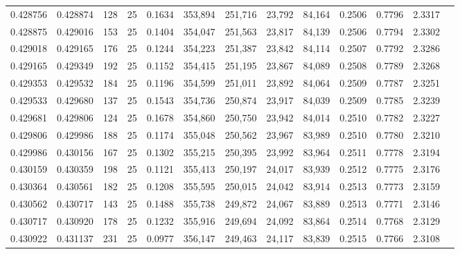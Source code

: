 \begin{tabular}{rrrrrrrrrrrrr}
0.428756 & 0.428874 &   128 &  25 &                                     0.1634 & 353,894 & 251,716 &  23,792 &  84,164 & 0.2506 & 0.7796 & 2.3317 \\
0.428875 & 0.429016 &   153 &  25 &                                     0.1404 & 354,047 & 251,563 &  23,817 &  84,139 & 0.2506 & 0.7794 & 2.3302 \\
0.429018 & 0.429165 &   176 &  25 &                                     0.1244 & 354,223 & 251,387 &  23,842 &  84,114 & 0.2507 & 0.7792 & 2.3286 \\
0.429165 & 0.429349 &   192 &  25 &                                     0.1152 & 354,415 & 251,195 &  23,867 &  84,089 & 0.2508 & 0.7789 & 2.3268 \\
0.429353 & 0.429532 &   184 &  25 &                                     0.1196 & 354,599 & 251,011 &  23,892 &  84,064 & 0.2509 & 0.7787 & 2.3251 \\
0.429533 & 0.429680 &   137 &  25 &                                     0.1543 & 354,736 & 250,874 &  23,917 &  84,039 & 0.2509 & 0.7785 & 2.3239 \\
0.429681 & 0.429806 &   124 &  25 &                                     0.1678 & 354,860 & 250,750 &  23,942 &  84,014 & 0.2510 & 0.7782 & 2.3227 \\
0.429806 & 0.429986 &   188 &  25 &                                     0.1174 & 355,048 & 250,562 &  23,967 &  83,989 & 0.2510 & 0.7780 & 2.3210 \\
0.429986 & 0.430156 &   167 &  25 &                                     0.1302 & 355,215 & 250,395 &  23,992 &  83,964 & 0.2511 & 0.7778 & 2.3194 \\
0.430159 & 0.430359 &   198 &  25 &                                     0.1121 & 355,413 & 250,197 &  24,017 &  83,939 & 0.2512 & 0.7775 & 2.3176 \\
0.430364 & 0.430561 &   182 &  25 &                                     0.1208 & 355,595 & 250,015 &  24,042 &  83,914 & 0.2513 & 0.7773 & 2.3159 \\
0.430562 & 0.430717 &   143 &  25 &                                     0.1488 & 355,738 & 249,872 &  24,067 &  83,889 & 0.2513 & 0.7771 & 2.3146 \\
0.430717 & 0.430920 &   178 &  25 &                                     0.1232 & 355,916 & 249,694 &  24,092 &  83,864 & 0.2514 & 0.7768 & 2.3129 \\
0.430922 & 0.431137 &   231 &  25 &                                     0.0977 & 356,147 & 249,463 &  24,117 &  83,839 & 0.2515 & 0.7766 & 2.3108 \\

\end{tabular}
